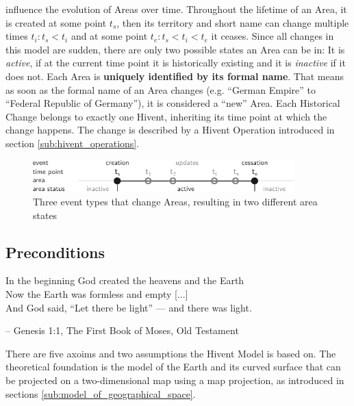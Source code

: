 influence the evolution of Areas over time. Throughout the lifetime of an Area, it is created at some point $t_s$, then its territory and short name can change multiple times $t_i: t_s < t_i$ and at some point $t_e: t_s < t_i < t_e$ it ceases. Since all changes in this model are sudden, there are only two possible states an Area can be in: It is \emph{active}, if at the current time point it is historically existing and it is \emph{inactive} if it does not. Each Area is \textbf{uniquely identified by its formal name}. That means as soon as the formal name of an Area changes (e.g. ``German Empire'' to ``Federal Republic of Germany''), it is considered a ``new'' Area. Each Historical Change belongs to exactly one Hivent, inheriting its time point at which the change happens.  The change is described by a Hivent Operation introduced in section \ref{sub:hivent_operations}.

\begin{figure}[H]
  \vspace{1em}
  \centering
  \includegraphics[width=0.9\textwidth]{graphics/development/hivent_model/area_states}
  \caption{Three event types that change Areas, resulting in two different area states}
  \label{fig:area_states}
\end{figure}




\subsection{Preconditions} %
\label{sub:preconditions}

\begin{quoteit}
In the beginning God created the heavens and the Earth \\
Now the Earth was formless and empty [...] \\
And God said, “Let there be light” --- and there was light.
\end{quoteit}
\vspace{-1em}
\hfill -- Genesis 1:1, The First Book of Moses, Old Testament

There are five axoims and two assumptions the Hivent Model is based on. The theoretical foundation is the model of the Earth and its curved surface that can be projected on a two-dimensional map using a map projection, as introduced in sections \ref{sub:model_of_geographical_space}.

